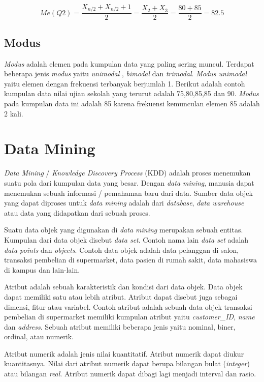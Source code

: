 \begin{displaymath}
Me(Q2) = \frac{X_{n/2} + X_{n/2}+1}{2} = \frac{X_{2} + X_{3}}{2} = \frac{80+85}{2} = 82.5
\end{displaymath}

\subsection{Modus}
\textit{Modus} adalah elemen pada kumpulan data yang paling sering muncul. Terdapat beberapa jenis \textit{modus} yaitu \textit{unimodal} , \textit{bimodal} dan \textit{trimodal}.  \textit{Modus unimodal} yaitu elemen dengan frekuensi terbanyak berjumlah 1. Berikut adalah contoh kumpulan data nilai ujian sekolah yang terurut adalah 75,80,85,85 dan 90. \textit{Modus} pada kumpulan data ini adalah 85 karena frekuensi kemunculan elemen 85 adalah 2 kali.  
 
 
\section{Data Mining}
\textit{Data Mining} / \textit{Knowledge Discovery Process} (KDD) adalah proses menemukan suatu pola dari kumpulan data yang besar. Dengan \textit{data mining}, manusia dapat menemukan sebuah 
informasi / pemahaman baru dari data. Sumber data objek yang dapat diproses untuk \textit{data mining} adalah dari \textit{database}, \textit{data warehouse} atau data yang didapatkan dari sebuah proses.

Suatu data objek yang digunakan di \textit{data mining} merupakan sebuah entitas. Kumpulan dari data objek disebut \textit{data set}. Contoh nama lain \textit{data set} adalah \textit{data points} dan \textit{objects}. Contoh data objek adalah data pelanggan di salon, transaksi pembelian di supermarket, data pasien di rumah sakit, data mahasiswa di kampus dan lain-lain.

Atribut adalah sebuah karakteristik dan kondisi dari data objek. Data objek dapat memiliki satu atau lebih atribut.  Atribut dapat disebut juga sebagai dimensi, fitur atau variabel. Contoh atribut adalah
sebuah data objek transaksi pembelian di supermarket memiliki kumpulan atribut yaitu \textit{customer\_ID}, \textit{name} dan \textit{address}. Sebuah atribut memiliki beberapa jenis yaitu nominal, biner, ordinal, atau numerik. 

Atribut numerik adalah jenis nilai kuantitatif. Atribut numerik dapat diukur kuantitasnya. Nilai dari atribut numerik dapat berupa bilangan bulat (\textit{integer}) atau bilangan \textit{real}. Atribut numerik dapat dibagi lagi menjadi interval dan rasio.   

